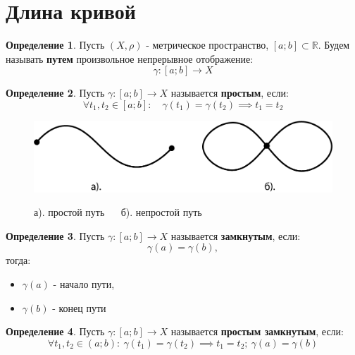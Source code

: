 \documentclass{report}
\theoremstyle{definition}
\newtheorem{definition}{Определение}[section]
\begin{document}
\section{Длина кривой}

\begin{definition}
  Пусть $(X,\rho)$ - метрическое пространство, $[a;b] \subset \mathbb{R}$. Будем называть \textbf{путем}
  произвольное непрерывное отображение:
  \begin{equation*}
    \gamma:[a;b]\rightarrow X
  \end{equation*}
\end{definition}

\begin{definition}
  Пусть $\gamma:[a;b]\rightarrow X$ называется \textbf{простым}, если:
  \begin{equation*}
    \forall t_1,t_2 \in[a;b]: \quad \gamma(t_1) = \gamma(t_2) \implies t_1 = t_2
  \end{equation*}
  \begin{figure}[H]
    \begin{center}
      \includegraphics[scale=0.2]{graph6.png}\label{figure6}

      а). простой путь $\quad$ б). непростой путь
    \end{center}
  \end{figure}
\end{definition}

\begin{definition}
  Пусть $\gamma:[a;b]\rightarrow X$ называется \textbf{замкнутым}, если:
  \begin{equation*}
    \gamma(a) = \gamma(b),
  \end{equation*}
  тогда:
  \begin{itemize}
    \item $\gamma(a)$ - начало пути,
    \item $\gamma(b)$ - конец пути
  \end{itemize}
\end{definition}

\begin{definition}
  Пусть $\gamma:[a;b]\rightarrow X$ называется \textbf{простым замкнутым}, если:
  \begin{equation*}
    \forall t_1,t_2\in(a;b): \ \gamma(t_1)=\gamma(t_2)\implies t_1=t_2; \ \gamma(a) = \gamma(b)
  \end{equation*}
\end{definition}
\end{document}
